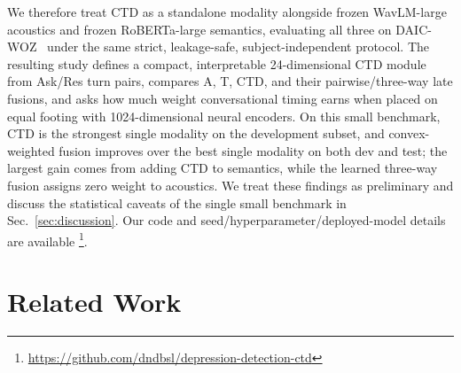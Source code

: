 \documentclass{article}
\begin{document}
We therefore treat CTD as a standalone modality alongside frozen WavLM-large acoustics and frozen RoBERTa-large semantics, evaluating all three on DAIC-WOZ~\cite{gratch2014daic} under the same strict, leakage-safe, subject-independent protocol. 
The resulting study defines a compact, interpretable 24-dimensional CTD module from Ask/Res turn pairs, compares A, T, CTD, and their pairwise/three-way late fusions, and asks how much weight conversational timing earns when placed on equal footing with 1024-dimensional neural encoders. 
On this small benchmark, CTD is the strongest single modality on the development subset, and convex-weighted fusion improves over the best single modality on both dev and test; the largest gain comes from adding CTD to semantics, while the learned three-way fusion assigns zero weight to acoustics. 
We treat these findings as preliminary and discuss the statistical caveats of the single small benchmark in Sec.~\ref{sec:discussion}. 
Our code and seed/hyperparameter/deployed-model details are available \footnote{\url{https://github.com/dndbsl/depression-detection-ctd}}.

\section{Related Work}
\label{sec:related}
\end{document}
